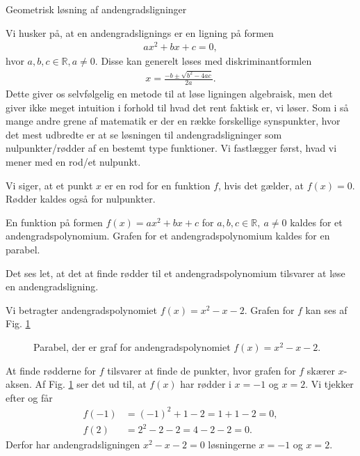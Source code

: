 
\begin{center}
\Huge
Geometrisk løsning af andengradsligninger
\end{center}
Vi husker på, at en andengradslignings er en ligning på formen
\begin{align*}
ax^2+bx+c=0,
\end{align*}
hvor $a,b,c\in \mathbb{R},a\neq 0.$ Disse kan generelt løses med diskriminantformlen
\begin{align*}
x = \frac{-b\pm \sqrt{b^2-4ac}}{2a}.
\end{align*}
Dette giver os selvfølgelig en metode til at løse ligningen algebraisk, men det giver ikke meget intuition i forhold til hvad det rent faktisk er, vi løser. Som i så mange andre grene af matematik er der en række forskellige synspunkter, hvor det mest udbredte er at se løsningen til andengradsligninger som nulpunkter/rødder af en bestemt type funktioner. Vi fastlægger først, hvad vi mener med en rod/et nulpunkt.
\begin{defn}
Vi siger, at et punkt $x$ er en rod for en funktion $f$, hvis det gælder, at $f(x)=0$. Rødder kaldes også for nulpunkter. 
\end{defn}
\begin{defn}
En funktion på formen $f(x)=ax^2+bx+c$ for $a,b,c\in \mathbb{R},\ a \neq 0$ kaldes for et andengradspolynomium. Grafen for et andengradspolynomium kaldes for en parabel.
\end{defn}
Det ses let, at det at finde rødder til et andengradspolynomium tilsvarer at løse en andengradsligning. 
\begin{exa}
Vi betragter andengradspolynomiet $f(x) = x^2-x-2$. Grafen for $f$ kan ses af Fig. \ref{fig:andengp}
\begin{figure}[H]
\center
{}
\caption{Parabel, der er graf for andengradspolynomiet $f(x)=x^2-x-2$.}
\label{fig:andengp}
\end{figure}
At finde rødderne for $f$ tilsvarer at finde de punkter, hvor grafen for $f$ skærer $x$-aksen. Af Fig. \ref{fig:andengp} ser det ud til, at $f(x)$ har rødder i $x=-1$ og $x=2$. Vi tjekker efter og får
\begin{align*}
f(-1) &= (-1)^2+1-2 = 1+1-2=0,\\
f(2) &= 2^2-2 - 2  = 4-2-2 = 0.
\end{align*}
Derfor har andengradsligningen $x^2-x-2=0$ løsningerne $x=-1$ og $x=2$.
\end{exa}
